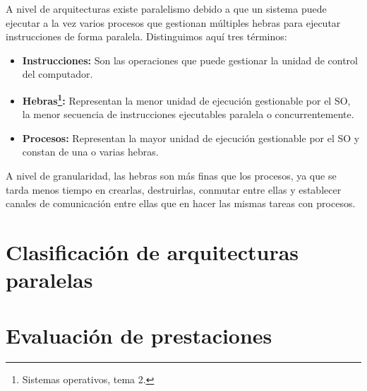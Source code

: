 A nivel de arquitecturas existe paralelismo debido a que un sistema puede ejecutar a la vez varios procesos que gestionan múltiples hebras para ejecutar instrucciones de forma paralela.
Distinguimos aquí tres términos:

\begin{itemize}
	\item\textbf{Instrucciones:} Son las operaciones que puede gestionar la unidad de control del computador.
	\item\textbf{Hebras\footnote{Sistemas operativos, tema 2.}:} Representan la menor unidad de ejecución gestionable por el SO, la menor secuencia de instrucciones ejecutables paralela o concurrentemente.
	\item\textbf{Procesos:} Representan la mayor unidad de ejecución gestionable por el SO y constan de una o varias hebras.
\end{itemize}

A nivel de granularidad, las hebras son más finas que los procesos, ya que se tarda menos tiempo en crearlas, destruirlas, conmutar entre ellas y establecer canales de comunicación entre ellas que en hacer las mismas tareas con procesos.

\section{Clasificación de arquitecturas paralelas}

\section{Evaluación de prestaciones}
